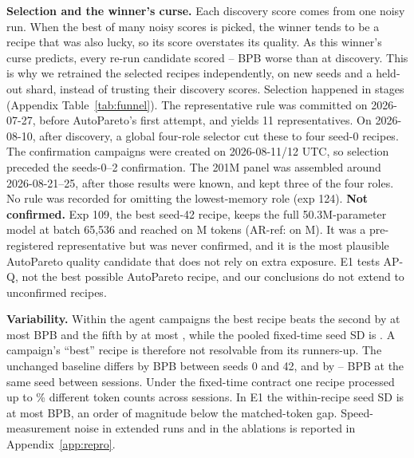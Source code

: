 \documentclass{article}
\newif\ifshowhumanmarkers \showhumanmarkersfalse
\newcommand{\humantag}[1]{{\color{humanframe}\sffamily\scriptsize\bfseries HUMAN AUTHOR MUST REWRITE/VERIFY [#1]}\ }
\newcommand{\humanauthor}[2][]{\ifshowhumanmarkers\begin{humanbox}\humantag{#1}#2\end{humanbox}\else #2\par\fi}
\begin{document}
\humanauthor[P2-09 r6]{\textbf{Selection and the winner's curse.} Each discovery score comes from one noisy run. When the best of many noisy scores is picked, the winner tends to be a recipe that was also lucky, so its score overstates its quality. As this winner's curse predicts, every re-run candidate scored \CROptMin--\CROptMax{} BPB worse than at discovery. This is why we retrained the selected recipes independently, on new seeds and a held-out shard, instead of trusting their discovery scores. Selection happened in stages (Appendix Table~\ref{tab:funnel}). The representative rule was committed on 2026-07-27, before AutoPareto's first attempt, and yields 11 representatives. On 2026-08-10, after discovery, a global four-role selector cut these to four seed-0 recipes. The confirmation campaigns were created on 2026-08-11/12 UTC, so selection preceded the seeds-0--2 confirmation. The 201M panel was assembled around 2026-08-21--25, after those results were known, and kept three of the four roles. No rule was recorded for omitting the lowest-memory role (exp 124). \textbf{Not confirmed.} Exp 109, the best seed-42 recipe, keeps the full 50.3M-parameter model at batch 65,536 and reached \CRExpOneZeroNineBPB{} on \CRExpOneZeroNineTokens M tokens (AR-ref: \CRSeedFortyTwoAR{} on \CRExpSixEightTokens M). It was a pre-registered representative but was never confirmed, and it is the most plausible AutoPareto quality candidate that does not rely on extra exposure. E1 tests AP-Q, not the best possible AutoPareto recipe, and our conclusions do not extend to unconfirmed recipes.}

\humanauthor[P2-10 r6]{\textbf{Variability.} Within the agent campaigns the best recipe beats the second by at most \CRGapTwoMax{} BPB and the fifth by at most \CRGapFiveMax, while the pooled fixed-time seed SD is \CRPooledSD. A campaign's ``best'' recipe is therefore not resolvable from its runners-up. The unchanged baseline differs by \CRBaseSeedEffect{} BPB between seeds 0 and 42, and by \CRSessionLo--\CRSessionHi{} BPB at the same seed between sessions. Under the fixed-time contract one recipe processed up to \CRTokenSpreadMax\% different token counts across sessions. In E1 the within-recipe seed SD is at most \CREOneMaxSD{} BPB, an order of magnitude below the matched-token gap. Speed-measurement noise in extended runs and in the ablations is reported in Appendix~\ref{app:repro}.}
\end{document}
